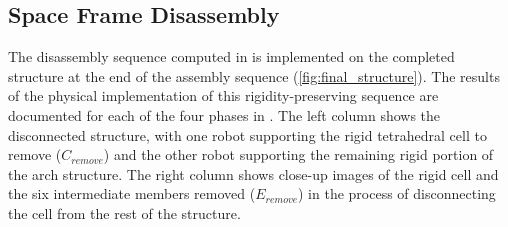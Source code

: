 \subsection{Space Frame Disassembly}\label{sec:6__disassembly}
    The disassembly sequence computed in  is implemented on the completed structure at the end of the assembly sequence (\cref{fig:final_structure}). The results of the physical implementation of this rigidity-preserving sequence are documented for each of the four phases in . The left column shows the disconnected structure, with one robot supporting the rigid tetrahedral cell to remove ($C_{remove}$) and the other robot supporting the remaining rigid portion of the arch structure. The right column shows close-up images of the rigid cell and the six intermediate members removed ($E_{remove}$) in the process of disconnecting the cell from the rest of the structure.

    \def\colpicwidth{0.37}
    \setcellgapes{0pt}
    
